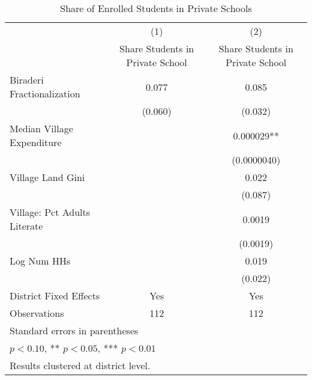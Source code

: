 \begin{table}[htbp]\centering
\def\sym#1{\ifmmode^{#1}\else\(^{#1}\)\fi}
\caption{Share of Enrolled Students in Private Schools \label{privateshare}}
\begin{tabular}{l*{2}{c}}
\toprule
                &\multicolumn{1}{c}{(1)}&\multicolumn{1}{c}{(2)}\\
                &\multicolumn{1}{c}{Share Students in Private School}&\multicolumn{1}{c}{Share Students in Private School}\\
\midrule
Biraderi Fractionalization&    0.077   &    0.085   \\
                &  (0.060)   &  (0.032)   \\
Median Village Expenditure&            & 0.000029** \\
                &            &(0.0000040)   \\
Village Land Gini&            &    0.022   \\
                &            &  (0.087)   \\
Village: Pct Adults Literate&            &   0.0019   \\
                &            & (0.0019)   \\
Log Num HHs     &            &    0.019   \\
                &            &  (0.022)   \\
District Fixed Effects&      Yes   &      Yes   \\
\midrule
Observations    &      112   &      112   \\
\bottomrule
\multicolumn{3}{l}{\footnotesize Standard errors in parentheses}\\
\multicolumn{3}{l}{\footnotesize * \(p<0.10\), ** \(p<0.05\), *** \(p<0.01\)}\\
\multicolumn{3}{l}{\footnotesize Results clustered at district level.}\\
\end{tabular}
\end{table}
